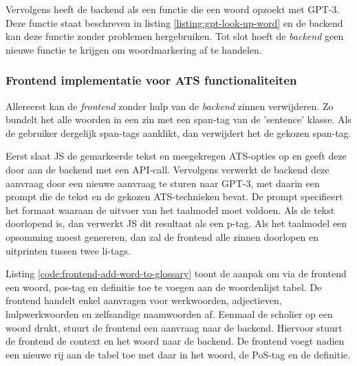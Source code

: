 
Vervolgens heeft de backend als een functie die een woord opzoekt met GPT-3. Deze functie staat beschreven in listing \ref{listing:gpt-look-up-word} en de backend kan deze functie zonder problemen hergebruiken. Tot slot hoeft de \textit{backend} geen nieuwe functie te krijgen om woordmarkering af te handelen.

\subsubsection{Frontend implementatie voor ATS functionaliteiten}


Allereerst kan de \textit{frontend} zonder hulp van de \textit{backend} zinnen verwijderen. Zo bundelt het alle woorden in een zin met een span-tag van de 'sentence' klasse. Als de gebruiker dergelijk span-tags aanklikt, dan verwijdert het de gekozen span-tag.

\medspace

Eerst slaat JS de gemarkeerde tekst en meegekregen ATS-opties op en geeft deze door aan de backend met een API-call. Vervolgens verwerkt de backend deze aanvraag door een nieuwe aanvraag te sturen naar GPT-3, met daarin een prompt die de tekst en de gekozen ATS-technieken bevat. De prompt specifieert het formaat waaraan de uitvoer van het taalmodel moet voldoen.  Als de tekst doorlopend is, dan verwerkt JS dit resultaat als een p-tag.  Als het taalmodel een opsomming moest genereren, dan zal de frontend alle zinnen doorlopen en uitprinten tussen twee li-tags.

\medspace

Listing \ref{code:frontend-add-word-to-glossary} toont de aanpak om via de frontend een woord, pos-tag en definitie toe te voegen aan de woordenlijst tabel. De frontend handelt enkel aanvragen voor werkwoorden, adjectieven, hulpwerkwoorden en zelfsandige naamwoorden af. Eenmaal de scholier op een woord drukt, stuurt de frontend een aanvraag naar de backend. Hiervoor stuurt de frontend de context en het woord naar de backend. De frontend voegt nadien een nieuwe rij aan de tabel toe met daar in het woord, de PoS-tag en de definitie.

